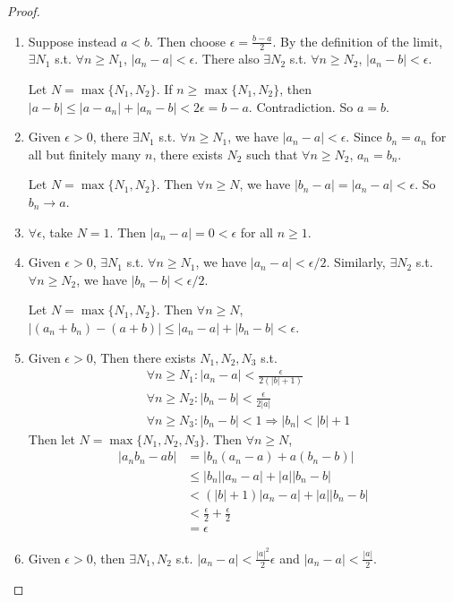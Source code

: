 \documentclass[a4paper]{article}
\begin{document}
  \begin{proof}\leavevmode
    \begin{enumerate}
      \item Suppose instead $a < b$. Then choose $\epsilon = \frac{b - a}{2}$. By the definition of the limit, $\exists N_1$ s.t. $\forall n\geq N_1$, $|a_n - a| < \epsilon$. There also $\exists N_2$ s.t. $\forall n\geq N_2$, $|a_n - b| < \epsilon$.

        Let $N = \max\{N_1, N_2\}$. If $n\geq \max\{N_1, N_2\}$, then $|a - b| \leq |a - a_n| + |a_n - b| < 2\epsilon = b - a.$
        Contradiction. So $a = b$.
      \item Given $\epsilon > 0$, there $\exists N_1$ s.t. $\forall n\geq N_1$, we have $|a_n - a| < \epsilon$. Since $b_n = a_n$ for all but finitely many $n$, there exists $N_2$ such that $\forall n\geq N_2$, $a_n = b_n$.

        Let $N = \max\{N_1, N_2\}$. Then $\forall n\geq N$, we have $|b_n - a| = |a_n - a| < \epsilon$. So $b_n\to a$.
      \item $\forall \epsilon$, take $N = 1$. Then $|a_n - a| = 0 < \epsilon$ for all $n \geq 1$.
      \item Given $\epsilon > 0$, $\exists N_1$ s.t. $\forall n\geq N_1$, we have $|a_n - a| < \epsilon/2$. Similarly, $\exists N_2$ s.t. $\forall n\geq N_2$, we have $|b_n - b| < \epsilon/2$. 

        Let $N = \max\{N_1, N_2\}$. Then $\forall n \geq N$, $|(a_n + b_n) - (a + b)| \leq |a_n - a| + |b_n - b| < \epsilon$.
      \item Given $\epsilon > 0$, Then there exists $N_1, N_2, N_3$ s.t.
        \begin{align*}
          &\forall n\geq N_1: |a_n - a| < \frac{\epsilon}{2(|b| + 1)}\\
          &\forall n\geq N_2: |b_n - b| < \frac{\epsilon}{2|a|}\\
          &\forall n\geq N_3: |b_n - b| < 1 \Rightarrow |b_n| < |b| +1
        \end{align*}
        Then let $N = \max\{N_1, N_2, N_3\}$. Then $\forall n\geq N$,
        \begin{align*}
          |a_nb_n - ab| &= |b_n(a_n - a) + a(b_n - b)|\\
          &\leq |b_n| |a_n - a| + |a||b_n - b|\\
          &< (|b| + 1) |a_n - a| + |a||b_n - b|\\
          &< \frac{\epsilon}{2} + \frac{\epsilon}{2}\\
          &= \epsilon
        \end{align*}
      \item Given $\epsilon > 0$, then $\exists N_1, N_2$ s.t. $|a_n - a| < \frac{|a|^2}{2}\epsilon$ and $|a_n - a| < \frac{|a|}{2}$.


\end{enumerate}
\end{proof}
\end{document}
